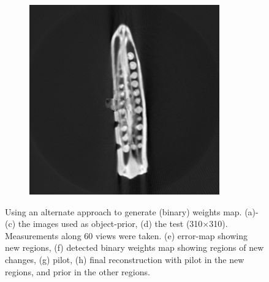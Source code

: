 \documentclass{article}
\begin{document}
\begin{figure}[]
\begin{subfigure}[b]{0.24\linewidth}
        \caption{}
    \end{subfigure}    
    \begin{subfigure}[b]{0.24\linewidth}
        \includegraphics[width=\textwidth]{../images/svm/okra/resultStitched_svm.png}
        \caption{}
     \end{subfigure}
     \caption[Selecting $k$]{Using an alternate approach to generate (binary) weights map. (a)-(c) the images used as object-prior, (d) the test (310$\times$310). Measurements along $60$ views were taken. (e) error-map showing new regions, (f) detected binary weights map showing regions of new changes, (g) pilot, (h) final reconstruction with pilot in the new regions, and prior in the other regions. } %
\label{fig:okra_svm}
\end{figure}
\end{document}

